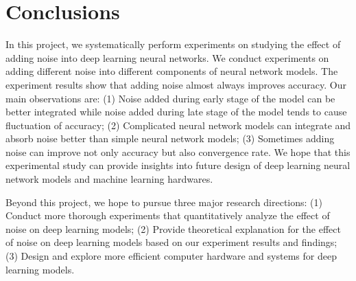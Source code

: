 \section{Conclusions}
\label{sec:conclusions}
In this project, we systematically perform experiments on studying the
effect of adding noise into deep learning neural networks.
We conduct experiments on adding different noise into different components
of neural network models. The experiment results show that adding noise almost always improves accuracy.
Our main observations are:
(1) Noise added during early stage of the model can be better integrated
while noise added during late stage of the model tends to cause
fluctuation of accuracy;
(2) Complicated neural network models can integrate and absorb
noise better than simple neural network models;
(3) Sometimes adding noise can improve not only accuracy but also
convergence rate.
We hope that this experimental study can provide insights into future design
of deep learning neural network models and machine learning hardwares.

Beyond this project, we hope to pursue three major research directions: (1)
Conduct more thorough experiments that quantitatively analyze the effect of
noise on deep learning models; (2) Provide theoretical explanation for the
effect of noise on deep learning models based on our experiment results and
findings; (3) Design and explore more efficient computer hardware and systems
for deep learning models.
